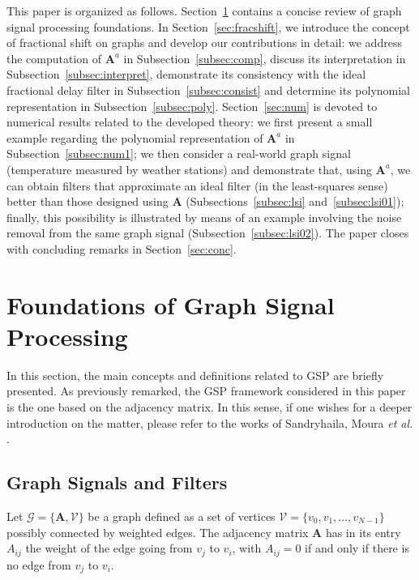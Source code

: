 This paper is organized as follows. Section~\ref{sec:revgsp} contains a concise review of graph signal processing foundations. In Section~\ref{sec:fracshift}, we introduce the concept of fractional shift on graphs and develop our contributions in detail: we address the computation of $\mathbf{A}^a$ in Subsection~\ref{subsec:comp}, discuss its interpretation in Subsection~\ref{subsec:interpret}, demonstrate its consistency with the ideal fractional delay filter in Subsection~\ref{subsec:consist} and determine its polynomial representation in Subsection~\ref{subsec:poly}. Section~\ref{sec:num} is devoted to numerical results related to the developed theory: we first present a small example regarding the polynomial representation of $\mathbf{A}^a$ in Subsection~\ref{subsec:num1}; we then consider a real-world graph signal (temperature measured by weather stations) and demonstrate that, using $\mathbf{A}^a$, we can obtain filters that  approximate an ideal filter (in the least-squares sense) better than those designed using $\mathbf{A}$ (Subsections~\ref{subsec:lsi} and~\ref{subsec:lsi01}); finally, this possibility is illustrated by means of an example involving the noise removal from the same graph signal (Subsection~\ref{subsec:lsi02}). The paper closes with concluding remarks in Section~\ref{sec:conc}.

\color{black}
\section{Foundations of Graph Signal Processing}\label{sec:revgsp}
In this section, the main concepts and definitions related to GSP are briefly presented. As previously remarked, the GSP framework considered in this paper is the one based on the adjacency matrix. In this sense, if one wishes for a deeper introduction on the matter, please refer to the works of Sandryhaila, Moura \emph{et al.} \cite{chen2015,sandryhaila2013discrete,sandryhaila2013filters,sandryhaila2013gft,sandryhaila2014big,sandryhaila2014frequency}.

\subsection{Graph Signals and Filters}
Let $ \mathcal{G} = \{\mathbf{A}, \mathcal{V}\} $ be a graph defined as a set of vertices $ \mathcal{V} = \{v_0, v_1, \dots, v_{N-1}\}$ possibly connected by weighted edges. The adjacency matrix $ \mathbf{A} $ has in its entry $ A_{ij} $ the weight of the edge going from $ v_j $ to $ v_i $, with $A_{ij} = 0 $ if and only if there is no edge from $ v_j $ to $ v_i $.

